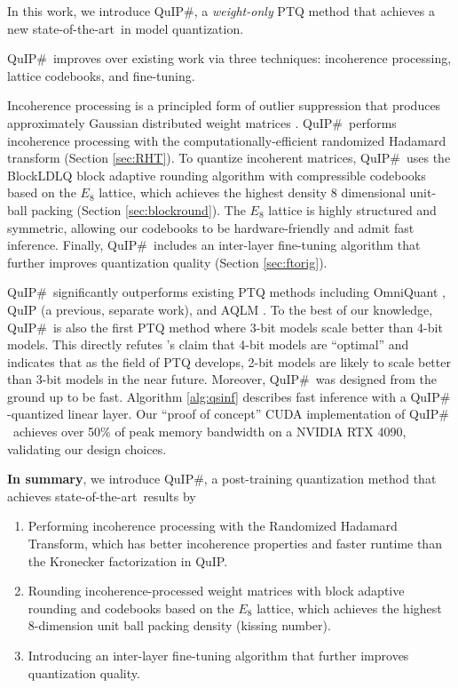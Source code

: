 In this work, we introduce QuIP$\#$, a \textit{weight-only} PTQ method that achieves a new state-of-the-art\  in model quantization.

QuIP$\#$~improves over existing work via three techniques: incoherence processing, lattice codebooks, and fine-tuning.

Incoherence processing is a principled form of outlier suppression that produces approximately Gaussian distributed weight matrices \cite{chee2023quip}.
QuIP$\#$\  performs incoherence processing with the computationally-efficient randomized Hadamard transform \cite{halko2011finding} (Section \ref{sec:RHT}).
To quantize incoherent matrices, QuIP$\#$\  uses the BlockLDLQ block adaptive rounding algorithm with compressible codebooks based on the $E_8$ lattice, which achieves the highest density 8 dimensional unit-ball packing \cite{maryna} (Section \ref{sec:blockround}). 
The $E_8$ lattice is highly structured and symmetric, allowing our codebooks to be hardware-friendly and admit fast inference. Finally, QuIP$\#$\  includes an inter-layer fine-tuning algorithm that further improves quantization quality (Section \ref{sec:ftorig}).

QuIP$\#$\  significantly outperforms existing PTQ methods including OmniQuant \cite{omniquant}, QuIP \cite{chee2023quip} (a previous, separate work), and AQLM \cite{aqlm}. To the best of our knowledge, QuIP$\#$\  is also the first PTQ method where 3-bit models scale better than 4-bit models. This directly refutes \citet{dettmers2022scaling}'s claim that 4-bit models are ``optimal'' and indicates that as the field of PTQ develops, 2-bit models are likely to scale better than 3-bit models in the near future. Moreover, QuIP$\#$\  was designed from the ground up to be fast. Algorithm \ref{alg:qsinf} describes fast inference with a QuIP$\#$-quantized linear layer. Our ``proof of concept'' CUDA implementation of QuIP$\#$\  achieves over 50\% of peak memory bandwidth on a NVIDIA RTX 4090, validating our design choices.

\textbf{In summary}, we introduce QuIP$\#$, a post-training quantization method that achieves state-of-the-art\  results by

\begin{enumerate}[nosep]
\item Performing incoherence processing with the Randomized Hadamard Transform, which has better incoherence properties and faster runtime than the Kronecker factorization in QuIP.
\item Rounding incoherence-processed weight matrices with block adaptive rounding and codebooks based on the $E_8$ lattice, which achieves the highest 8-dimension unit ball packing density (kissing number).
\item Introducing an inter-layer fine-tuning algorithm that further improves quantization quality.
\end{enumerate}

